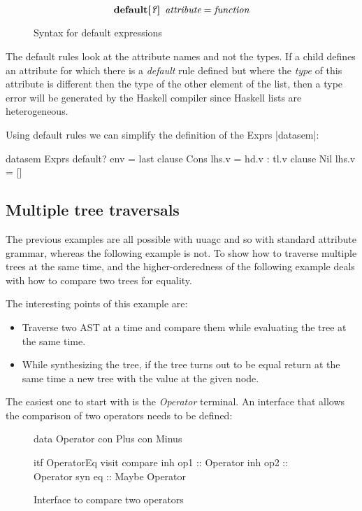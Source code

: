 \begin{figure}[h!]
\[
\textbf{default[\textit{?}]} \hspace{5pt} \emph{attribute} = \emph{function}
\]
\caption{Syntax for default expressions}
\label{default:syntax}
\end{figure}

The default rules look at the attribute names and not the types. If a child defines an attribute for which there is a \emph{default} rule defined but where the \emph{type} of this attribute is different then the type of the other element of the list, then a type error will be generated by the Haskell compiler since Haskell lists are heterogeneous.

Using default rules we can simplify the definition of the Exprs |datasem|:

\begin{code}
datasem Exprs
   default? env = last
   clause Cons
     lhs.v = hd.v : tl.v
   clause Nil
     lhs.v = []
\end{code}

\subsection{Multiple tree traversals}
The previous examples are all possible with uuagc and so with standard attribute grammar, whereas the following example is not. To show how to traverse multiple trees at the same time, and the higher-orderedness of \rcore the following example deals with how to compare two trees for equality.

The interesting points of this example are:
\begin{itemize}
\item Traverse two AST at a time and compare them while evaluating the tree at the same time.
\item While synthesizing the tree, if the tree turns out to be equal return at the same time a new tree with the value at the given node.
\end{itemize}

The easiest one to start with is the \emph{Operator} terminal. An interface that allows the comparison of two operators needs to be defined:

\begin{figure}[H]
\begin{minipage}[t]{0.3\linewidth}
\begin{code}
data Operator
  con Plus
  con Minus
\end{code}
\end{minipage}
\begin{minipage}[t]{0.7\linewidth}
\begin{code}
itf OperatorEq
  visit compare
    inh op1  :: Operator
    inh op2  :: Operator
    syn eq   :: Maybe Operator
\end{code}
\end{minipage}
\caption{Interface to compare two operators}
\end{figure}

